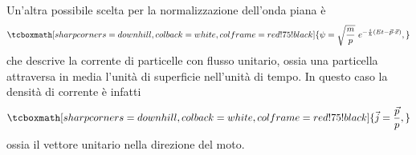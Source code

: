 Un'altra possibile scelta per la normalizzazione dell'onda piana è
	\begin{equation}
		\tcboxmath[sharp corners=downhill, colback=white, colframe=red!75!black]{	
			\psi  = \sqrt{\frac{m}{p}}\ e^{-\frac{i}{\hbar} (Et - \vec{p}\cdot \vec{x})},
			}
	\end{equation}
che descrive la corrente di particelle con flusso unitario, ossia una particella attraversa in media l'unità di superficie nell'unità di tempo. In questo caso la densità di corrente è infatti
	\begin{equation}
		\tcboxmath[sharp corners=downhill, colback=white, colframe=red!75!black]{
			\vec{j}=  \frac{\vec{p}}{p},
			}
	\end{equation}
ossia il vettore unitario nella direzione del moto.
